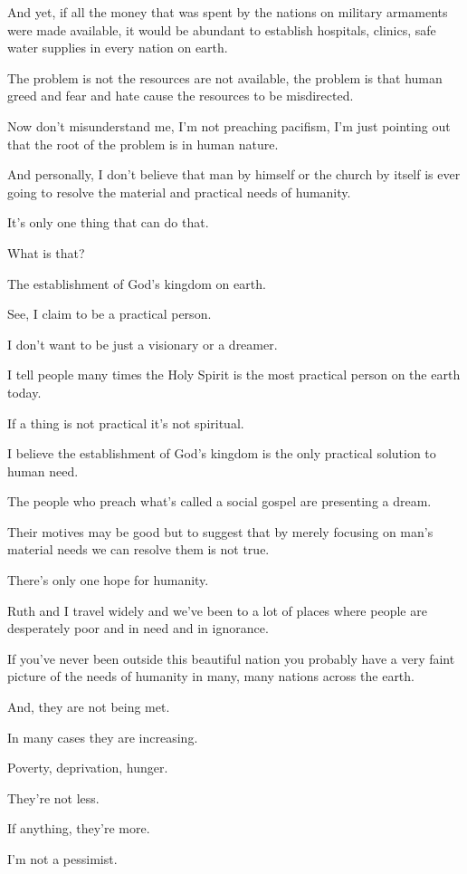 \documentclass[11pt]{article}
\begin{document}
And yet, if all the money that was spent by
the nations on military armaments were made
available, it would be abundant to establish
hospitals, clinics, safe water supplies in
every nation on earth.

The problem is not the resources are not
available, the problem is that human greed and
fear and hate cause the resources to be
misdirected.

Now don't misunderstand me, I'm not preaching
pacifism, I'm just pointing out that the root
of the problem is in human nature.

And personally, I don't believe that man by
himself or the church by itself is ever going
to resolve the material and practical needs of
humanity.

It's only one thing that can do that.

What is that?

The establishment of God's kingdom on earth.

See, I claim to be a practical person.

I don't want to be just a visionary or a
dreamer.

I tell people many times the Holy Spirit is
the most practical person on the earth today.

If a thing is not practical it's not
spiritual.

I believe the establishment of God's kingdom
is the only practical solution to human need.

The people who preach what's called a social
gospel are presenting a dream.

Their motives may be good but to suggest that
by merely focusing on man's material needs we
can resolve them is not true.

There's only one hope for humanity.

Ruth and I travel widely and we've been to a
lot of places where people are desperately
poor and in need and in ignorance.

If you've never been outside this beautiful
nation you probably have a very faint picture
of the needs of humanity in many, many nations
across the earth.

And, they are not being met.

In many cases they are increasing.

Poverty, deprivation, hunger.

They're not less.

If anything, they're more.

I'm not a pessimist.
\end{document}
